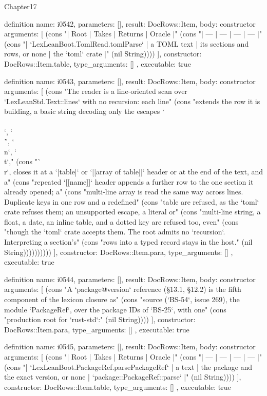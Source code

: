 \begin{lexlean}{Chapter17}
\begin{semanticmodule}
definition{
  name: i0542,
  parameters: [],
  result: DocRows::Item,
  body: constructor{
    arguments: [
      (cons "| Root | Takes | Returns | Oracle |" (cons "| --- | --- | --- | --- |" (cons "| `LexLeanBoot.TomlRead.tomlParse` | a TOML text | its sections and rows, or none | the `toml` crate |" (nil String))))
    ],
    constructor: DocRows::Item.table,
    type_arguments: []
  },
  executable: true
}

definition{
  name: i0543,
  parameters: [],
  result: DocRows::Item,
  body: constructor{
    arguments: [
      (cons "The reader is a line-oriented scan over `LexLeanStd.Text::lines` with no recursion: each line" (cons "extends the row it is building, a basic string decoding only the escapes `\\\\`, `\\\"`, `\\n`, `\\t`," (cons "`\\r`, closes it at a `[table]` or `[[array of table]]` header or at the end of the text, and a" (cons "repeated `[[name]]` header appends a further row to the one section it already opened; a" (cons "multi-line array is read the same way across lines. Duplicate keys in one row and a redefined" (cons "table are refused, as the `toml` crate refuses them; an unsupported escape, a literal or" (cons "multi-line string, a float, a date, an inline table, and a dotted key are refused too, even" (cons "though the `toml` crate accepts them. The root admits no `recursion`. Interpreting a section's" (cons "rows into a typed record stays in the host." (nil String))))))))))
    ],
    constructor: DocRows::Item.para,
    type_arguments: []
  },
  executable: true
}

definition{
  name: i0544,
  parameters: [],
  result: DocRows::Item,
  body: constructor{
    arguments: [
      (cons "A `package@version` reference (§13.1, §12.2) is the fifth component of the lexicon closure as" (cons "source (`BS-54`, issue 269), the module `PackageRef`, over the package IDs of `BS-25`, with one" (cons "production root for `rust-std`:" (nil String))))
    ],
    constructor: DocRows::Item.para,
    type_arguments: []
  },
  executable: true
}

definition{
  name: i0545,
  parameters: [],
  result: DocRows::Item,
  body: constructor{
    arguments: [
      (cons "| Root | Takes | Returns | Oracle |" (cons "| --- | --- | --- | --- |" (cons "| `LexLeanBoot.PackageRef.parsePackageRef` | a text | the package and the exact version, or none | `package::PackageRef::parse` |" (nil String))))
    ],
    constructor: DocRows::Item.table,
    type_arguments: []
  },
  executable: true
}


\end{semanticmodule}
\end{lexlean}
